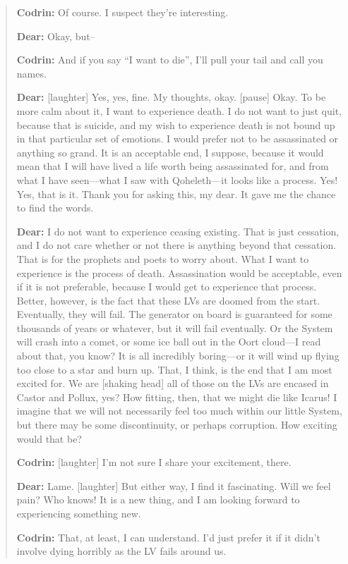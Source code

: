 \begin{quote}
\textbf{Codrin:} Of course. I suspect they're interesting.

\textbf{Dear:} Okay, but--

\textbf{Codrin:} And if you say ``I want to die'', I'll pull your tail and call you names.

\textbf{Dear:} {[}laughter{]} Yes, yes, fine. My thoughts, okay. {[}pause{]} Okay. To be more calm about it, I want to experience death. I do not want to just quit, because that is suicide, and my wish to experience death is not bound up in that particular set of emotions. I would prefer not to be assassinated or anything so grand. It is an acceptable end, I suppose, because it would mean that I will have lived a life worth being assassinated for, and from what I have seen---what I saw with Qoheleth---it looks like a process. Yes! Yes, that is it. Thank you for asking this, my dear. It gave me the chance to find the words.

\textbf{Dear:} I do not want to experience ceasing existing. That is just cessation, and I do not care whether or not there is anything beyond that cessation. That is for the prophets and poets to worry about. What I want to experience is the process of death. Assassination would be acceptable, even if it is not preferable, because I would get to experience that process. Better, however, is the fact that these LVs are doomed from the start. Eventually, they will fail. The generator on board is guaranteed for some thousands of years or whatever, but it will fail eventually. Or the System will crash into a comet, or some ice ball out in the Oort cloud---I read about that, you know? It is all incredibly boring---or it will wind up flying too close to a star and burn up. That, I think, is the end that I am most excited for. We are {[}shaking head{]} all of those on the LVs are encased in Castor and Pollux, yes? How fitting, then, that we might die like Icarus! I imagine that we will not necessarily feel too much within our little System, but there may be some discontinuity, or perhaps corruption. How exciting would that be?

\textbf{Codrin:} {[}laughter{]} I'm not sure I share your excitement, there.

\textbf{Dear:} Lame. {[}laughter{]} But either way, I find it fascinating. Will we feel pain? Who knows! It is a new thing, and I am looking forward to experiencing something new.

\textbf{Codrin:} That, at least, I can understand. I'd just prefer it if it didn't involve dying horribly as the LV fails around us.


\end{quote}
